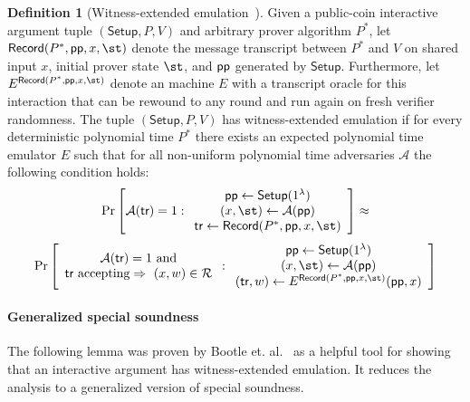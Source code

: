 \documentclass{article}
\theoremstyle{definition}
\newtheorem{definition}{Definition}
\newcommand{\alaninline}[1]{{\todo[color=blue!20!white, inline]{Alan: #1}}}
\newcommand{\alaninline}[1]{}
\begin{document}
\begin{definition}[Witness-extended emulation~\cite{EC:GroIsh08}]\label{def:wee}
Given a public-coin interactive argument tuple $(\textsf{Setup}, P, V)$ and arbitrary prover algorithm $P^*$, let $\textsf{Record}(P^*, \params, x, \st)$ denote the message transcript between $P^*$ and $V$ on shared input $x$, initial prover state $\st$, and $\textsf{pp}$ generated by $\textsf{Setup}$. Furthermore, let $E^{\textsf{Record}(P^*, \params, x, \st)}$ denote an machine $E$ with a transcript oracle for this interaction that can be rewound to any round and run again on fresh verifier randomness. The tuple $(\textsf{Setup}, P, V)$ has witness-extended emulation if for every deterministic polynomial time $P^*$ there exists an expected polynomial time emulator $E$ such that for all non-uniform polynomial time adversaries $\mathcal{A}$ the following condition holds: 
\[
\Pr \left[
\mathcal{A}(\textsf{tr}) = 1
:
\begin{array}{c}
             \params \leftarrow \textsf{Setup}(1^\lambda) \\
             (x, \st) \leftarrow \mathcal{A}(\params) \\
             \tr \leftarrow \textsf{Record}(P^*, \params, x, \st)
\end{array} 
\right] \approx
\]
\[
\Pr \left[
\begin{array}{c} 
\mathcal{A}(\textsf{tr}) = 1 \ \text{and} \\ 
\text{\tr~accepting} \Rightarrow \ (x, w) \in \mathcal{R}
\end{array} 
:
\begin{array}{c}
             \params \leftarrow \textsf{Setup}(1^\lambda) \\
             (x, \st) \leftarrow \mathcal{A}(\params) \\
(\textsf{tr}, w) \leftarrow E^{\textsf{Record}(P^*, \params, x, \st)}(\params, x)
\end{array}
\right]
\]

\end{definition}


\paragraph{Generalized special soundness} The following lemma was proven by Bootle et. al.~\cite{EC:BCCGP16} as a helpful tool for showing that an interactive argument has witness-extended emulation. It reduces the analysis to a generalized version of special soundness. 
\end{document}
